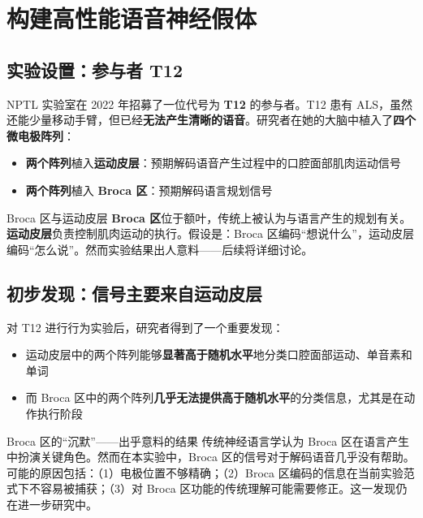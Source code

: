 \section{构建高性能语音神经假体}

\subsection{实验设置：参与者 T12}

NPTL 实验室在 2022 年招募了一位代号为 \textbf{T12} 的参与者。T12 患有 ALS，虽然还能少量移动手臂，但已经\textbf{无法产生清晰的语音}。研究者在她的大脑中植入了\textbf{四个微电极阵列}：

\begin{itemize}
    \item \textbf{两个阵列}植入\textbf{运动皮层}：预期解码语音产生过程中的口腔面部肌肉运动信号
    \item \textbf{两个阵列}植入 \textbf{Broca 区}：预期解码语言规划信号
\end{itemize}

\begin{knowledgebox}{Broca 区与运动皮层}
\textbf{Broca 区}位于额叶，传统上被认为与语言产生的规划有关。\textbf{运动皮层}负责控制肌肉运动的执行。假设是：Broca 区编码``想说什么''，运动皮层编码``怎么说''。然而实验结果出人意料——后续将详细讨论。
\end{knowledgebox}

\subsection{初步发现：信号主要来自运动皮层}

对 T12 进行行为实验后，研究者得到了一个重要发现：

\begin{itemize}
    \item 运动皮层中的两个阵列能够\textbf{显著高于随机水平}地分类口腔面部运动、单音素和单词
    \item 而 Broca 区中的两个阵列\textbf{几乎无法提供高于随机水平}的分类信息，尤其是在动作执行阶段
\end{itemize}

\begin{warningbox}{Broca 区的``沉默''——出乎意料的结果}
传统神经语言学认为 Broca 区在语言产生中扮演关键角色。然而在本实验中，Broca 区的信号对于解码语音几乎没有帮助。可能的原因包括：（1）电极位置不够精确；（2）Broca 区编码的信息在当前实验范式下不容易被捕获；（3）对 Broca 区功能的传统理解可能需要修正。这一发现仍在进一步研究中。
\end{warningbox}

